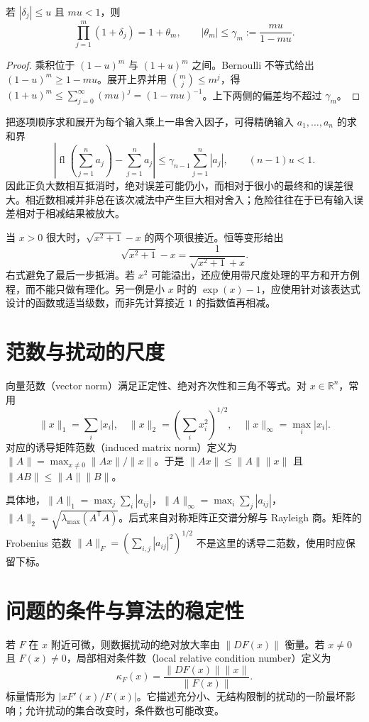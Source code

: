 \begin{proposition}[连乘的误差合并]
若 $|\delta_j|\le u$ 且 $mu<1$，则
\[
 \prod_{j=1}^{m}(1+\delta_j)=1+\theta_m,
 \qquad |\theta_m|\le\gamma_m:=\frac{mu}{1-mu}.
\]
\end{proposition}
\begin{proof}
乘积位于 $(1-u)^m$ 与 $(1+u)^m$ 之间。Bernoulli 不等式给出 $(1-u)^m\ge1-mu$。展开上界并用 $\binom mj\le m^j$，得 $(1+u)^m\le\sum_{j=0}^\infty(mu)^j=(1-mu)^{-1}$。上下两侧的偏差均不超过 $\gamma_m$。
\end{proof}

把逐项顺序求和展开为每个输入乘上一串舍入因子，可得精确输入 $a_1,\ldots,a_n$ 的求和界
\[
 |\operatorname{fl}(\textstyle\sum_{j=1}^n a_j)-\sum_{j=1}^n a_j|
 \le\gamma_{n-1}\sum_{j=1}^n|a_j|,
 \qquad (n-1)u<1.
\]
因此正负大数相互抵消时，绝对误差可能仍小，而相对于很小的最终和的误差很大。相近数相减并非总在该次减法中产生巨大相对舍入；危险往往在于已有输入误差相对于相减结果被放大。

\begin{example}[等价公式的不同计算效果]
当 $x>0$ 很大时，$\sqrt{x^2+1}-x$ 的两个项很接近。恒等变形给出
\[
 \sqrt{x^2+1}-x=\frac1{\sqrt{x^2+1}+x}.
\]
右式避免了最后一步抵消。若 $x^2$ 可能溢出，还应使用带尺度处理的平方和开方例程，而不能只做有理化。另一例是小 $x$ 时的 $\exp(x)-1$，应使用针对该表达式设计的函数或适当级数，而非先计算接近 $1$ 的指数值再相减。
\end{example}

\section{范数与扰动的尺度}
\label{sec:na-norms}
\begin{definition}[向量范数与诱导矩阵范数]
向量范数（vector norm）满足正定性、绝对齐次性和三角不等式。对 $x\in\mathbb R^n$，常用
\[
 \|x\|_1=\sum_i|x_i|,\quad
 \|x\|_2=(\sum_i x_i^2)^{1/2},\quad
 \|x\|_\infty=\max_i|x_i|.
\]
对应的诱导矩阵范数（induced matrix norm）定义为 $\|A\|=\max_{x\ne0}\|Ax\|/\|x\|$。于是 $\|Ax\|\le\|A\|\|x\|$ 且 $\|AB\|\le\|A\|\|B\|$。
\end{definition}
具体地，$\|A\|_1=\max_j\sum_i|a_{ij}|$，$\|A\|_\infty=\max_i\sum_j|a_{ij}|$，$\|A\|_2=\sqrt{\lambda_{\max}(A^{\mathsf T}A)}$。后式来自对称矩阵正交谱分解与 Rayleigh 商。矩阵的 Frobenius 范数 $\|A\|_F=(\sum_{i,j}|a_{ij}|^2)^{1/2}$ 不是这里的诱导二范数，使用时应保留下标。

\section{问题的条件与算法的稳定性}
\label{sec:na-conditioning}
\begin{definition}[局部条件数]
若 $F$ 在 $x$ 附近可微，则数据扰动的绝对放大率由 $\|DF(x)\|$ 衡量。若 $x\ne0$ 且 $F(x)\ne0$，局部相对条件数（local relative condition number）定义为
\[
 \kappa_F(x)=\frac{\|DF(x)\|\|x\|}{\|F(x)\|}.
\]
标量情形为 $|xF'(x)/F(x)|$。它描述充分小、无结构限制的扰动的一阶最坏影响；允许扰动的集合改变时，条件数也可能改变。
\end{definition}

